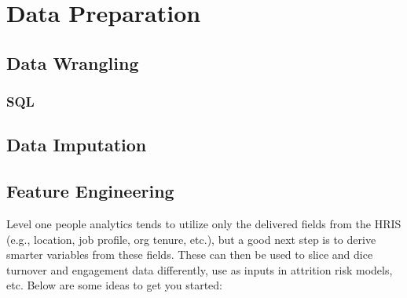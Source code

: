 \documentclass[]{book}
\begin{document}
\hypertarget{data-prep}{%
\chapter{Data Preparation}\label{data-prep}}

\hypertarget{data-wrangling}{%
\section{Data Wrangling}\label{data-wrangling}}

\hypertarget{sql}{%
\subsection{SQL}\label{sql}}

\hypertarget{data-imputation}{%
\section{Data Imputation}\label{data-imputation}}

\hypertarget{feature-engineering}{%
\section{Feature Engineering}\label{feature-engineering}}

Level one people analytics tends to utilize only the delivered fields from the HRIS (e.g., location, job profile, org tenure, etc.), but a good next step is to derive smarter variables from these fields. These can then be used to slice and dice turnover and engagement data differently, use as inputs in attrition risk models, etc. Below are some ideas to get you started:
\end{document}

